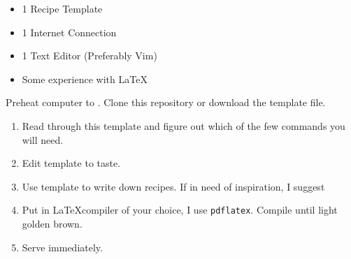 \documentclass{article}
\begin{document}



\thispagestyle{firstpage}

\ingredients
\begin{itemize}
    \item 1 Recipe Template
    \item 1 Internet Connection
    \item 1 Text Editor (Preferably Vim)
    \item Some experience with \LaTeX
\end{itemize}

\instructions
Preheat computer to . Clone this repository or download the template file.
\begin{enumerate}
    \item Read through this template and figure out which of the few commands you will need.
    \item Edit template to taste.
    \item Use template to write down recipes. If in need of inspiration, I suggest 
    \item Put in \LaTeX compiler of your choice, I use \texttt{pdflatex}. Compile until light golden brown.
    \item Serve immediately.
\end{enumerate}

\spewfootnotes
\end{document}
